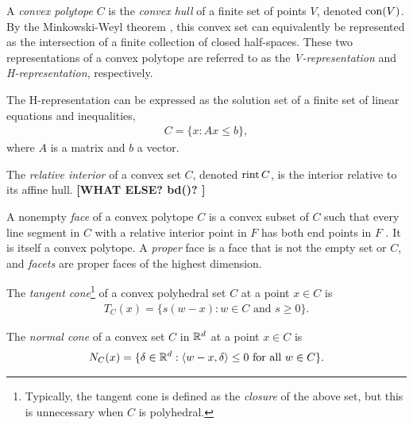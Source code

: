 A \emph{convex polytope} $C$ is the \emph{convex hull} of a finite set of points $V$, denoted $\operatorname{con}( V )$.
By the Minkowski-Weyl theorem \citep[Theorem 19.1]{Rockafellar:1970}, this convex 
set can equivalently be represented as the intersection of a finite collection of 
closed half-spaces.  These two representations of a convex polytope are referred to 
as the \emph{V-representation} and \emph{H-representation}, respectively.  

The H-representation can be expressed as the solution set of a finite set of linear 
equations and inequalities,
\begin{align*}
	C = \{x: Ax \leq b \},
\end{align*}
where $A$ is a matrix and $b$ a vector.

The \emph{relative interior} of a convex set $C$, denoted $\operatorname{rint} C$, is the interior 
relative to its affine hull.  
\textbf{[WHAT ELSE? bd()? ]}

A nonempty \emph{face} of a convex polytope $C$ is a convex subset of $C$ such that 
every line segment in $C$ with a relative interior point in $F$ has both end points in 
$F$ \citep{Rockafellar:1970}.  It is itself a convex polytope.
A \emph{proper} face is a face that is not the empty set or $C$, and 
\emph{facets} are proper faces of the highest dimension.

The \emph{tangent cone}\footnote{Typically, the tangent cone is defined 
as the \emph{closure} of the above set, but
this is unnecessary when $C$ is polyhedral.}
 of a convex polyhedral set $C$ at a point $x \in C$ is
\begin{align*}
	T_C(x) = \{s(w-x):w \in C \text{ and } s \geq 0 \}.
\end{align*}


The \emph{normal cone} of a convex set $C$ in ${\mathbb R}^d$ at a point $x \in C$ is 
\begin{align*}
	N_C(x) = \{ \delta \in {\mathbb R}^d: \langle w-x,\delta \rangle \leq 0 \text{ for all } w \in C 
\}.
\end{align*}

